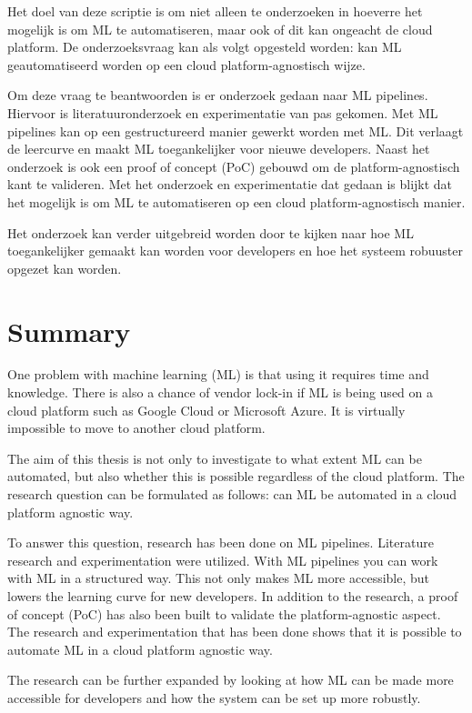 Het doel van deze scriptie is om niet alleen te onderzoeken in hoeverre het mogelijk is om ML te automatiseren, maar ook of dit kan ongeacht de cloud platform. De onderzoeksvraag kan als volgt opgesteld worden: kan ML geautomatiseerd worden op een cloud platform-agnostisch wijze.

Om deze vraag te beantwoorden is er onderzoek gedaan naar ML pipelines. Hiervoor is literatuuronderzoek en experimentatie van pas gekomen. Met ML pipelines kan op een gestructureerd manier gewerkt worden met ML. Dit verlaagt de leercurve en maakt ML toegankelijker voor nieuwe developers. Naast het onderzoek is ook een proof of concept (PoC) gebouwd om de platform-agnostisch kant te valideren. Met het onderzoek en experimentatie dat gedaan is blijkt dat het mogelijk is om ML te automatiseren op een cloud platform-agnostisch manier.

Het onderzoek kan verder uitgebreid worden door te kijken naar hoe ML toegankelijker gemaakt kan worden voor developers en hoe het systeem robuuster opgezet kan worden.

\newpage

\section*{Summary}
One problem with machine learning (ML) is that using it requires time and knowledge. There is also a chance of vendor lock-in if ML is being used on a cloud platform such as Google Cloud or Microsoft Azure. It is virtually impossible to move to another cloud platform.

The aim of this thesis is not only to investigate to what extent ML can be automated, but also whether this is possible regardless of the cloud platform. The research question can be formulated as follows: can ML be automated in a cloud platform agnostic way.

To answer this question, research has been done on ML pipelines. Literature research and experimentation were utilized. With ML pipelines you can work with ML in a structured way. This not only makes ML more accessible, but lowers the learning curve for new developers. In addition to the research, a proof of concept (PoC) has also been built to validate the platform-agnostic aspect. The research and experimentation that has been done shows that it is possible to automate ML in a cloud platform agnostic way.

The research can be further expanded by looking at how ML can be made more accessible for developers and how the system can be set up more robustly. 

\newpage